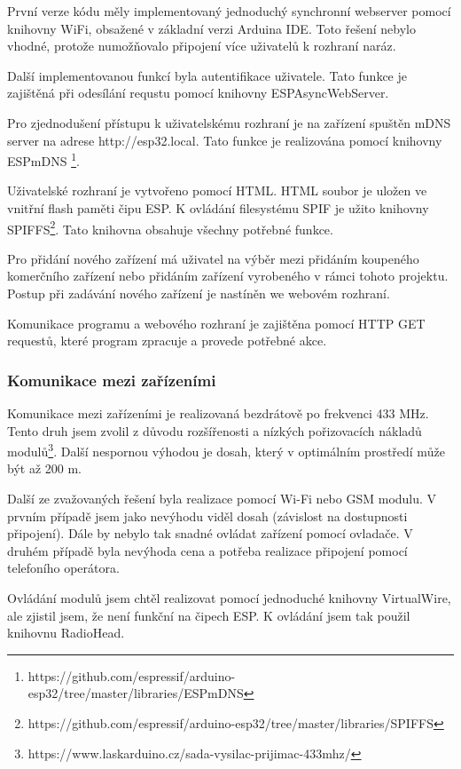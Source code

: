 \documentclass[11pt,a4paper,twoside,openright]{report}
\begin{document}
První verze kódu měly implementovaný jednoduchý synchronní webserver pomocí knihovny WiFi, obsažené v základní verzi Arduina IDE. Toto řešení nebylo vhodné, protože numožňovalo připojení více uživatelů k rozhraní naráz.


Další implementovanou funkcí byla autentifikace uživatele. Tato funkce je zajištěná při odesílání requstu pomocí knihovny ESPAsyncWebServer.


Pro zjednodušení přístupu k uživatelskému rozhraní je na zařízení spuštěn mDNS server na adrese http://esp32.local. Tato funkce je realizována pomocí knihovny ESPmDNS \footnote{https://github.com/espressif/arduino-esp32/tree/master/libraries/ESPmDNS}.


Uživatelské rozhraní je vytvořeno pomocí HTML. HTML soubor je uložen ve vnitřní flash paměti čipu ESP. K ovládání filesystému SPIF je užito knihovny SPIFFS\footnote{https://github.com/espressif/arduino-esp32/tree/master/libraries/SPIFFS}. Tato knihovna obsahuje všechny potřebné funkce.


Pro přidání nového zařízení má uživatel na výběr mezi přidáním koupeného komerčního zařízení nebo přidáním zařízení vyrobeného v rámci tohoto projektu. Postup při zadávání nového zařízení je nastíněn we webovém rozhraní.


Komunikace programu a webového rozhraní je zajištěna pomocí HTTP GET requestů, které program zpracuje a provede potřebné akce. 


\subsubsection{Komunikace mezi zařízeními}

Komunikace mezi zařízeními je realizovaná bezdrátově po frekvenci 433 MHz. Tento druh jsem zvolil z důvodu rozšířenosti a nízkých pořizovacích nákladů modulů\footnote{https://www.laskarduino.cz/sada-vysilac-prijimac-433mhz/}. Další nespornou výhodou je dosah, který v optimálním prostředí může být až 200 m.


Další ze zvažovaných řešení byla realizace pomocí Wi-Fi nebo GSM modulu. V prvním případě jsem jako nevýhodu viděl dosah (závislost na dostupnosti připojení). Dále by nebylo tak snadné ovládat zařízení pomocí ovladače. V druhém případě byla nevýhoda cena a potřeba realizace připojení pomocí telefoního operátora.


Ovládání modulů jsem chtěl realizovat pomocí jednoduché knihovny VirtualWire, ale zjistil jsem, že není funkční na čipech ESP. K ovládání jsem tak použil knihovnu RadioHead. 
\end{document}
